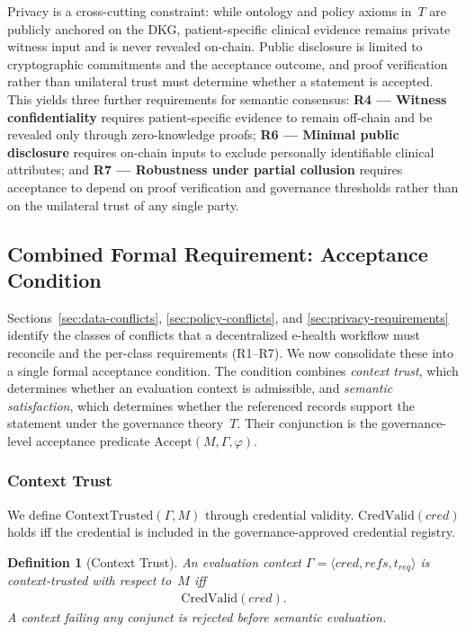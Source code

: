 \documentclass[journal]{IEEEtran}
\newtheorem{definition}{Definition}
\begin{document}
Privacy is a cross-cutting constraint: while ontology and policy axioms in~$T$ are publicly anchored on the DKG, patient-specific clinical evidence remains private witness input and is never revealed on-chain. Public disclosure is limited to cryptographic commitments and the acceptance outcome, and proof verification rather than unilateral trust must determine whether a statement is accepted. This yields three further requirements for semantic consensus: \textbf{R4 --- Witness confidentiality} requires patient-specific evidence to remain off-chain and be revealed only through zero-knowledge proofs; \textbf{R6 --- Minimal public disclosure} requires on-chain inputs to exclude personally identifiable clinical attributes; and \textbf{R7 --- Robustness under partial collusion} requires acceptance to depend on proof verification and governance thresholds rather than on the unilateral trust of any single party.

\subsection{Combined Formal Requirement: Acceptance Condition}
\label{sec:formal-basis}

Sections~\ref{sec:data-conflicts}, \ref{sec:policy-conflicts}, and \ref{sec:privacy-requirements} identify the classes of conflicts that a decentralized e-health workflow must reconcile and the per-class requirements (R1--R7). We now consolidate these into a single formal acceptance condition. The condition combines \emph{context trust}, which determines whether an evaluation context is admissible, and \emph{semantic satisfaction}, which determines whether the referenced records support the statement under the governance theory~$T$. Their conjunction is the governance-level acceptance predicate $\mathrm{Accept}(M, \Gamma, \varphi)$.

\subsubsection{Context Trust}
\label{sec:context-trust}
We define $\mathrm{ContextTrusted}(\Gamma, M)$ through credential validity. $\mathrm{CredValid}(\mathit{cred})$ holds iff the credential is included in the governance-approved credential registry.

\begin{definition}[Context Trust]
\label{def:context-trusted}
An evaluation context $\Gamma = \langle \mathit{cred}, \mathit{refs}, t_{\mathit{req}} \rangle$ is context-trusted with respect to~$M$ iff
\begin{equation}
\begin{aligned}
   \mathrm{CredValid}(\mathit{cred}).
\end{aligned}
\label{eq:context-trusted}
\end{equation}
A context failing any conjunct is rejected before semantic evaluation.
\end{definition}
\end{document}
